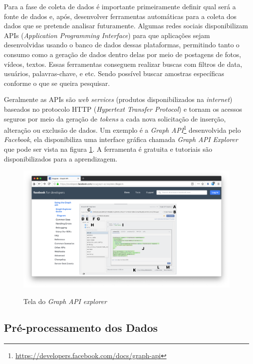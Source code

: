 Para a fase de coleta de dados é importante primeiramente definir qual será a fonte de dados e, após, desenvolver ferramentas automáticas para a coleta dos dados que se pretende analisar futuramente. Algumas redes sociais disponibilizam APIs (\textit{Application Programming Interface}) para que aplicações sejam desenvolvidas usando o banco de dados dessas plataformas, permitindo tanto o consumo como a geração de dados dentro delas por meio de postagens de fotos, vídeos, textos. Essas ferramentas conseguem realizar buscas com filtros de data, usuários, palavras-chave, e etc. Sendo possível buscar amostras específicas conforme o que se queira pesquisar.

Geralmente as APIs são \textit{web services} (produtos disponibilizados na \textit{internet}) baseados no protocolo HTTP (\textit{Hypertext Transfer Protocol}) e tornam os acessos seguros por meio da geração de \textit{tokens} a cada nova solicitação de inserção, alteração ou exclusão de dados. Um exemplo é a \textit{Graph API}\footnote{\url{https://developers.facebook.com/docs/graph-api}} desenvolvida pelo \textit{Facebook}, ela disponibiliza uma interface gráfica chamada \textit{Graph API Explorer} que pode ser vista na figura \ref{fig:GraphAPIExplorer}. A ferramenta é gratuita e tutoriais são disponibilizados para a aprendizagem.

\begin{figure}[!h]
\centering 
\caption{Tela do \textit{Graph API explorer}}
\includegraphics[scale=0.35]{imagens/graphapiexplorer.png}
\label{fig:GraphAPIExplorer}
\end{figure}

\subsection{Pré-processamento dos Dados}
\label{subsec:preproc}

